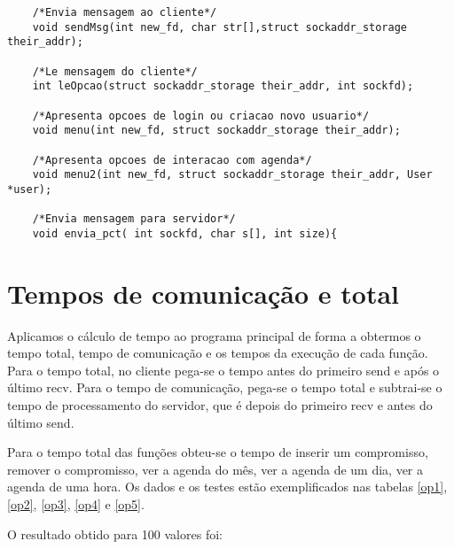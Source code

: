 \documentclass[10pt,a4paper]{article}
\begin{document}
\begin{itemize}
\begin{lstlisting}
    /*Envia mensagem ao cliente*/
	void sendMsg(int new_fd, char str[],struct sockaddr_storage their_addr);
	
    /*Le mensagem do cliente*/
    int leOpcao(struct sockaddr_storage their_addr, int sockfd);
    
    /*Apresenta opcoes de login ou criacao novo usuario*/
    void menu(int new_fd, struct sockaddr_storage their_addr);
    
    /*Apresenta opcoes de interacao com agenda*/
    void menu2(int new_fd, struct sockaddr_storage their_addr, User *user);

    /*Envia mensagem para servidor*/
    void envia_pct( int sockfd, char s[], int size){

    \end{lstlisting}


  \end{itemize}


  \section{Tempos de comunicação e total}

Aplicamos o cálculo de tempo ao programa principal de
  forma a obtermos o tempo total,  tempo de comunicação e os tempos da
  execução de cada função.
  Para o tempo total, no cliente pega-se o tempo antes do primeiro send e após o último recv.
  Para o tempo de comunicação, pega-se o tempo total e subtrai-se o tempo de processamento do servidor,
  que é depois do primeiro recv e antes do último send.

  Para o tempo total das funções obteu-se o tempo de inserir um
  compromisso, remover o compromisso, ver a agenda do mês, ver a agenda
  de um dia, ver a agenda de uma hora. Os dados e os testes estão
  exemplificados nas tabelas \ref{op1}, \ref{op2}, \ref{op3},
  \ref{op4} e \ref{op5}.

  O resultado obtido para 100 valores foi:
\end{document}
